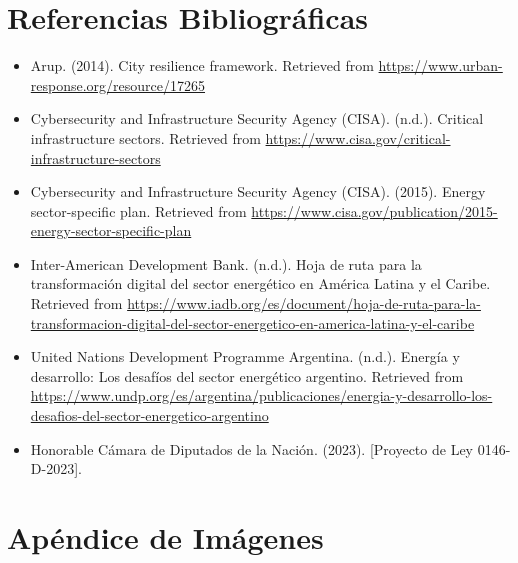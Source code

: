 \documentclass{article}
\begin{document}
\hypertarget{referencias-bibliogruxe1ficas}{%
\section{Referencias
Bibliográficas}\label{referencias-bibliogruxe1ficas}}

\begin{itemize}
\item
  Arup. (2014). City resilience framework. Retrieved from
  \url{https://www.urban-response.org/resource/17265}
\item
  Cybersecurity and Infrastructure Security Agency (CISA). (n.d.).
  Critical infrastructure sectors. Retrieved from
  \url{https://www.cisa.gov/critical-infrastructure-sectors}
\item
  Cybersecurity and Infrastructure Security Agency (CISA). (2015).
  Energy sector-specific plan. Retrieved from
  \url{https://www.cisa.gov/publication/2015-energy-sector-specific-plan}
\item
  Inter-American Development Bank. (n.d.). Hoja de ruta para la
  transformación digital del sector energético en América Latina y el
  Caribe. Retrieved from
  \url{https://www.iadb.org/es/document/hoja-de-ruta-para-la-transformacion-digital-del-sector-energetico-en-america-latina-y-el-caribe}
\item
  United Nations Development Programme Argentina. (n.d.). Energía y
  desarrollo: Los desafíos del sector energético argentino. Retrieved
  from
  \url{https://www.undp.org/es/argentina/publicaciones/energia-y-desarrollo-los-desafios-del-sector-energetico-argentino}
\item
  Honorable Cámara de Diputados de la Nación. (2023). {[}Proyecto de Ley
  0146-D-2023{]}.
\end{itemize}

\hypertarget{apuxe9ndice-de-imuxe1genes}{%
\section{Apéndice de Imágenes}\label{apuxe9ndice-de-imuxe1genes}}

\newpage
\end{document}
